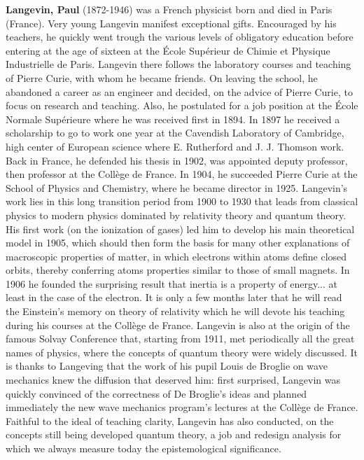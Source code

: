 \textbf{Langevin, Paul} (1872-1946) was a French physicist born and died in Paris (France). Very young Langevin manifest exceptional gifts. Encouraged by his teachers, he quickly went trough the various levels of obligatory education before entering at the age of sixteen at the École Supérieur de Chimie et Physique Industrielle de Paris. Langevin there follows the laboratory courses and teaching of Pierre Curie, with whom he became friends. On leaving the school, he abandoned a career as an engineer and decided, on the advice of Pierre Curie, to focus on research and teaching. Also, he postulated for a job position at the École Normale Supérieure where he was received first in 1894. In 1897 he received a scholarship to go to work one year at the Cavendish Laboratory of Cambridge, high center of European science where E. Rutherford and J. J. Thomson work. Back in France, he defended his thesis in 1902, was appointed deputy professor, then professor at the Collège de France. In 1904, he succeeded Pierre Curie at the School of Physics and Chemistry, where he became director in 1925. Langevin's work lies in this long transition period from 1900 to 1930 that leads from classical physics to modern physics dominated by relativity theory and quantum theory. His first work (on the ionization of gases) led him to develop his main theoretical model in 1905, which should then form the basis for many other explanations of macroscopic properties of matter, in which electrons within atoms define closed orbits, thereby conferring atoms properties similar to those of small magnets. In 1906 he founded the surprising result that inertia is a property of energy... at least in the case of the electron. It is only a few months later that he will read the Einstein's memory on theory of relativity which he will devote his teaching during his courses at the Collège de France. Langevin is also at the origin of the famous Solvay Conference that, starting from 1911, met periodically all the great names of physics, where the concepts of quantum theory were widely discussed. It is thanks to Langeving that the work of his pupil Louis de Broglie on wave mechanics knew the diffusion that deserved him: first surprised, Langevin was quickly convinced of the correctness of De Broglie's ideas and planned immediately the new wave mechanics program's lectures at the Collège de France. Faithful to the ideal of teaching clarity, Langevin has also conducted, on the concepts still being developed quantum theory, a job and redesign analysis for which we always measure today the epistemological significance.

